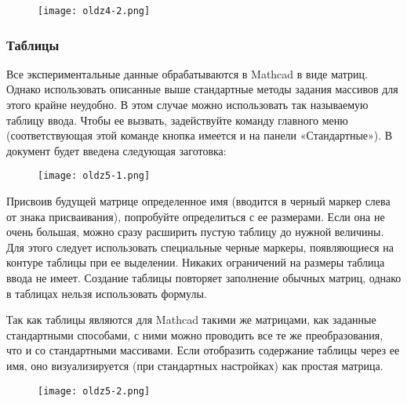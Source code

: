 \begin{figure}[h]
	\begin{center}
		\texttt{[image: oldz4-2.png]}
	\end{center}
\end{figure}

\subsubsection*{Таблицы}
Все экспериментальные данные обрабатываются в Mathcad в виде матриц. Однако использовать описанные выше стандартные методы задания массивов для этого крайне неудобно. В этом случае можно использовать так называемую таблицу ввода. Чтобы ее вызвать, задействуйте команду  главного меню (соответствующая этой команде кнопка имеется и на панели «Стандартные»). В документ будет введена следующая заготовка:
\begin{figure}[h]
	\begin{center}
		\texttt{[image: oldz5-1.png]}
	\end{center}
\end{figure}

Присвоив будущей матрице определенное имя (вводится в черный маркер слева от знака присваивания), попробуйте определиться с ее размерами. Если она не очень большая, можно сразу расширить пустую таблицу до нужной величины. Для этого следует использовать специальные черные маркеры, появляющиеся на контуре таблицы при ее выделении. Никаких ограничений на размеры таблица ввода не имеет. Создание таблицы повторяет заполнение обычных матриц, однако в таблицах нельзя использовать формулы.

Так как таблицы являются для Mathcad такими же матрицами, как заданные стандартными способами, с ними можно проводить все те же преобразования, что и со стандартными массивами. Если отобразить содержание таблицы через ее имя, оно визуализируется (при стандартных настройках) как простая матрица.

\begin{figure}[h]
	\begin{center}
		\texttt{[image: oldz5-2.png]}
	\end{center}
\end{figure}


